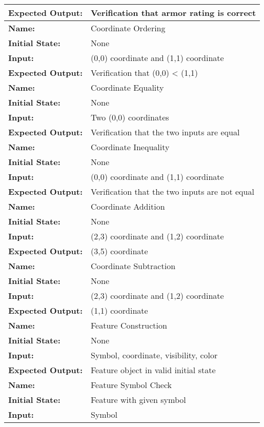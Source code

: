 \documentclass[12pt, titlepage]{article}
\begin{document}
\begin{center}
\begin{longtable}{ l | p{10cm} }
				\textbf{Expected Output:} & Verification that armor rating is correct\\
				\hline
				\textbf{Name:} & Coordinate Ordering\\
				\textbf{Initial State:} & None\\
				\textbf{Input:} & (0,0) coordinate and (1,1) coordinate\\
				\textbf{Expected Output:} & Verification that (0,0) < (1,1)\\
				\hline
				\textbf{Name:} & Coordinate Equality\\
				\textbf{Initial State:} & None\\
				\textbf{Input:} & Two (0,0) coordinates\\
				\textbf{Expected Output:} & Verification that the two inputs are equal\\
				\hline
				\textbf{Name:} & Coordinate Inequality\\
				\textbf{Initial State:} & None\\
				\textbf{Input:} & (0,0) coordinate and (1,1) coordinate\\
				\textbf{Expected Output:} & Verification that the two inputs are not equal\\
				\hline
				\textbf{Name:} & Coordinate Addition\\
				\textbf{Initial State:} & None\\
				\textbf{Input:} & (2,3) coordinate and (1,2) coordinate\\
				\textbf{Expected Output:} & (3,5) coordinate\\
				\hline
				\textbf{Name:} & Coordinate Subtraction\\
				\textbf{Initial State:} & None\\
				\textbf{Input:} & (2,3) coordinate and (1,2) coordinate\\
				\textbf{Expected Output:} & (1,1) coordinate\\
				\hline
				\textbf{Name:} & Feature Construction\\
				\textbf{Initial State:} & None\\
				\textbf{Input:} & Symbol, coordinate, visibility, color\\
				\textbf{Expected Output:} & Feature object in valid initial state\\
				\hline
				\textbf{Name:} & Feature Symbol Check\\
				\textbf{Initial State:} & Feature with given symbol\\
				\textbf{Input:} & Symbol\\

\end{longtable}
\end{center}
\end{document}
